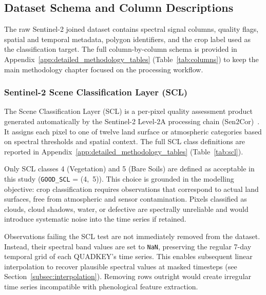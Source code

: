 \subsection{Dataset Schema and Column Descriptions}
\label{subsec:schema}

The raw Sentinel-2 joined dataset contains spectral signal columns,
quality flags, spatial and temporal metadata, polygon identifiers, and
the crop label used as the classification target. The full
column-by-column schema is provided in Appendix~\ref{app:detailed_methodology_tables}
(Table~\ref{tab:columns}) to keep the main methodology chapter focused on
the processing workflow.


\subsubsection{Sentinel-2 Scene Classification Layer (SCL)}
\label{subsubsec:scl}

The Scene Classification Layer (SCL) is a per-pixel quality assessment
product generated automatically by the Sentinel-2 Level-2A processing
chain (Sen2Cor)~\cite{mainknorn2017sen2cor}. It assigns each pixel to one
of twelve land surface or atmospheric categories based on spectral
thresholds and spatial context. The full SCL class definitions are
reported in Appendix~\ref{app:detailed_methodology_tables}
(Table~\ref{tab:scl}).

Only SCL classes 4 (Vegetation) and 5 (Bare Soils) are defined as
acceptable in this study (\texttt{GOOD\_SCL} = (4,~5)). This choice is
grounded in the modelling objective: crop classification requires
observations that correspond to actual land surfaces, free from
atmospheric and sensor contamination. Pixels classified as clouds, cloud
shadows, water, or defective are spectrally unreliable and would introduce
systematic noise into the time series if retained.

Observations failing the SCL test are not immediately removed from the
dataset. Instead, their spectral band values are set to \texttt{NaN},
preserving the regular 7-day temporal grid of each QUADKEY's time series.
This enables subsequent linear interpolation to recover plausible spectral
values at masked timesteps (see Section~\ref{subsec:interpolation}).
Removing rows outright would create irregular time series incompatible
with phenological feature extraction.


